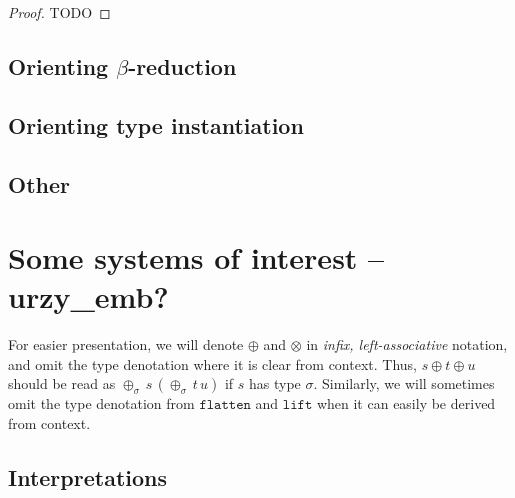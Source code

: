 \documentclass[runningheads,a4paper]{llncs}
\newcommand{\flatten}{\mathtt{flatten}}
\newcommand{\lift}{\mathtt{lift}}
\begin{document}
\begin{proof}
TODO
\end{proof}

\subsection{Orienting $\beta$-reduction}

\subsection{Orienting type instantiation}

\subsection{Other}

\section{Some systems of interest -- urzy\_emb?}

For easier presentation, we will denote $\oplus$ and $\otimes$ in
\emph{infix, left-associative} notation, and omit the type denotation
where it is clear from context.  Thus, $s \oplus t \oplus u$ should be
read as $\oplus_\sigma\,s\,(\oplus_\sigma\,t\,u)$ if $s$ has type
$\sigma$. Similarly, we will sometimes omit the type denotation from
$\flatten$ and $\lift$ when it can easily be derived from context.

\subsection{Interpretations}
\end{document}
